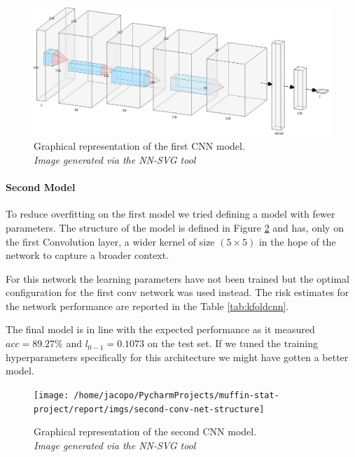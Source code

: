 \begin{figure}[h]
    \centering
    \includegraphics[scale=0.15]{imgs/custom-cnn-one}
    \caption{
        Graphical representation of the first CNN model.\\
        \textit{Image generated via the NN-SVG tool}
    }\label{fig:custom_cnn}
\end{figure}

\paragraph{Second Model}

To reduce overfitting on the first model we tried defining a model with fewer parameters.
The structure of the model is defined in Figure \ref{fig:second-conv-net-structure}
and has, only on the first Convolution layer, a wider kernel of size $(5\times5)$ in the hope of the network to capture a broader context.

For this network the learning parameters have not been trained but the optimal configuration for the first conv network
was used instead.
The risk estimates for the network performance are reported in the Table \ref{tab:kfoldcnn}.

The final model is in line with the expected performance as it measured $acc=89.27\%$ and $l_{0-1}=0.1073$ on the test set.
If we tuned the training hyperparameters specifically for this architecture we might have gotten a better model.


\begin{figure}
    \centering
    \texttt{[image: /home/jacopo/PycharmProjects/muffin-stat-project/report/imgs/second-conv-net-structure]}
    \caption{
        Graphical representation of the second CNN model.\\
        \textit{Image generated via the NN-SVG tool}
    }
    \label{fig:second-conv-net-structure}
\end{figure}



